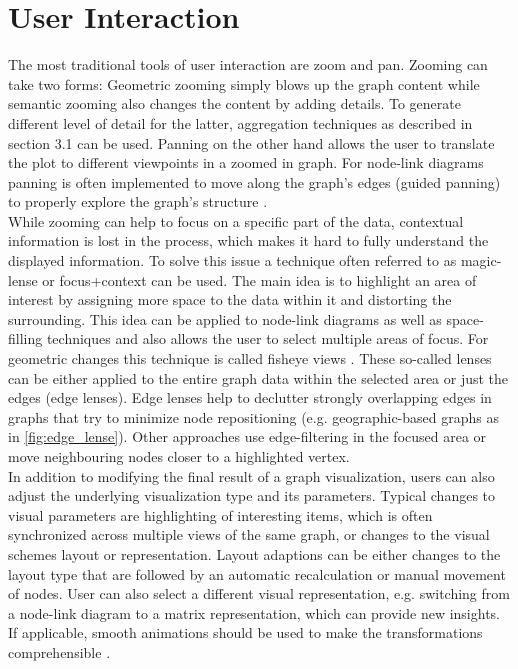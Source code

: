 \section{User Interaction}
The most traditional tools of user interaction are zoom and pan. Zooming can take two forms: Geometric zooming simply blows up the graph content while semantic zooming also changes the content by adding details\cite{Herman2000}. To generate different level of detail for the latter, aggregation techniques as described in section 3.1 can be used. Panning on the other hand allows the user to translate the plot to different viewpoints in a zoomed in graph. For node-link diagrams panning is often implemented to move along the graph's edges (guided panning) to properly explore the graph's structure \cite{VonLandesberger2011}.\\ 
While zooming can help to focus on a specific part of the data, contextual information is lost in the process, which makes it hard to fully understand the displayed information. To solve this issue a technique often referred to as magic-lense \cite{VonLandesberger2011} or focus+context \cite{Herman2000} can be used. The main idea is to highlight an area of interest by assigning more space to the data within it and distorting the surrounding. This idea can be applied to node-link diagrams as well as space-filling techniques and also allows the user to select multiple areas of focus. For geometric changes this technique is called fisheye views \cite{VonLandesberger2011}. These so-called lenses can be either applied to the entire graph data within the selected area or just the edges (edge lenses). Edge lenses help to declutter strongly overlapping edges in graphs that try to minimize node repositioning (e.g. geographic-based graphs as in \autoref{fig:edge_lense}). Other approaches use edge-filtering in the focused area or move neighbouring nodes closer to a highlighted vertex.\\
In addition to modifying the final result of a graph visualization, users can also adjust the underlying visualization type and its parameters. Typical changes to visual parameters are highlighting of interesting items, which is often synchronized across multiple views of the same graph, or changes to the visual schemes layout or representation. Layout adaptions can be either changes to the layout type that are followed by an automatic recalculation or manual movement of nodes. User can also select a different visual representation, e.g. switching from a node-link diagram to a matrix representation, which can provide new insights. If applicable, smooth animations should be used to make the transformations comprehensible \cite{VonLandesberger2011}.


